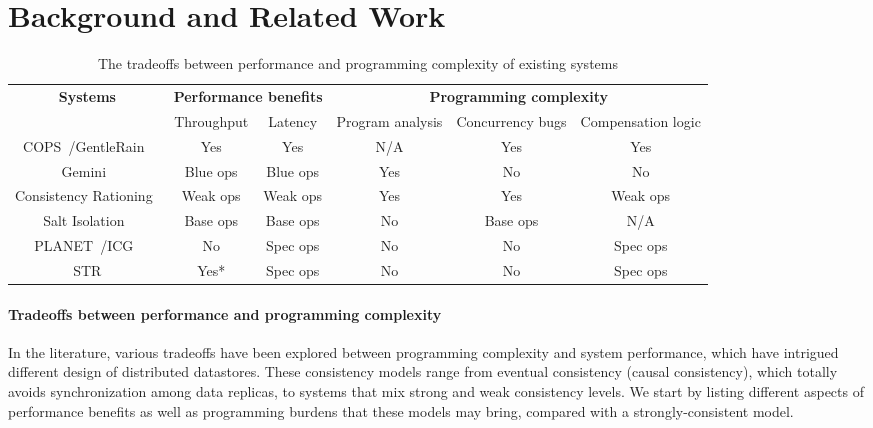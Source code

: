 \section{Background and Related Work}
\begin{table*}
\small
\begin{center}
  \begin{tabular}{ c | c | c | c | c | c } 
      \multirow{2}{*}{\textbf{Systems}} & \multicolumn{2}{c|}{\textbf{Performance benefits}} &  \multicolumn{3}{c}{\textbf{Programming complexity}}   \\ \hhline{~-----}
       & Throughput & Latency & Program analysis & Concurrency bugs & Compensation logic \\ \hline
       COPS~\cite{lloyd2011don}/GentleRain~\cite{du2014gentlerain} &  Yes & Yes & N/A & Yes & Yes \\ \hline
       Gemini~\cite{li2012making} & Blue ops & Blue ops & Yes & No & No \\ \hline
       Consistency Rationing~\cite{kraska2009consistency} & Weak ops & Weak ops & Yes & Yes & Weak ops \\ \hline
       Salt Isolation~\cite{xie2014salt} & Base ops & Base ops & No & Base ops & N/A \\ \hline
       PLANET~\cite{pang2014planet}/ICG~\cite{icg} &  No  & Spec ops  & No & No & Spec ops \\ \hline
       STR &  Yes*  & Spec ops & No & No & Spec ops \\ \hline
  \end{tabular}
\end{center}
\caption{The tradeoffs between performance and programming complexity of existing systems}
\label{tab:related}
\end{table*}

\paragraph{Tradeoffs between performance and programming complexity} In the literature, various tradeoffs have been explored between programming complexity and system performance, which have intrigued different design of distributed datastores. These consistency models range from eventual consistency (causal consistency), which totally avoids synchronization among data replicas, to systems that mix strong and weak consistency levels. We start by listing different aspects of performance benefits as well as programming burdens that these models may bring, compared with a strongly-consistent model.

